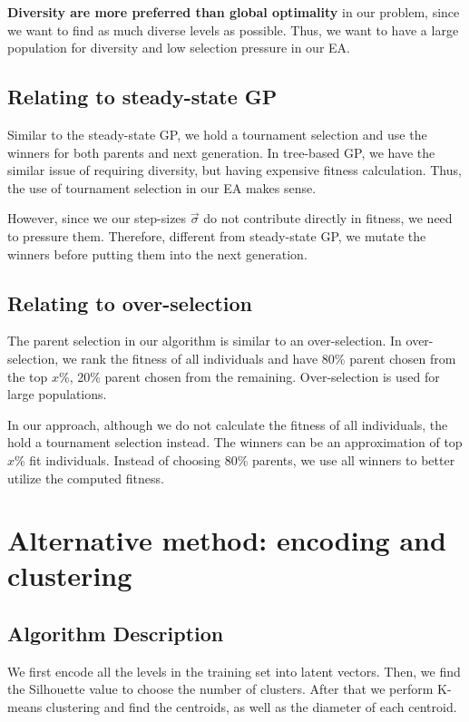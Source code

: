 \documentclass[manuscript,screen,review]{acmart}
\begin{document}
\textbf{Diversity are more preferred than global optimality} in our problem, since we want to find as much diverse levels as possible. Thus, we want to have a large population for diversity and low selection pressure in our EA.

\subsection{Relating to steady-state GP}

Similar to the steady-state GP, we hold a tournament selection and use the winners for both parents and next generation. In tree-based GP, we have the similar issue of requiring diversity, but having expensive fitness calculation. Thus, the use of tournament selection in our EA makes sense.

However, since we our step-sizes $\vec{\sigma}$ do not contribute directly in fitness, we need to pressure them. Therefore, different from steady-state GP, we mutate the winners before putting them into the next generation.

\subsection{Relating to over-selection}

The parent selection in our algorithm is similar to an over-selection. In over-selection, we rank the fitness of all individuals and have 80\% parent chosen from the top $x$\%, 20\% parent chosen from the remaining. Over-selection is used for large populations.

In our approach, although we do not calculate the fitness of all individuals, the hold a tournament selection instead. The winners can be an approximation of top $x$\% fit individuals. Instead of choosing 80\% parents, we use all winners to better utilize the computed fitness.

\section{Alternative method: encoding and clustering}

\subsection{Algorithm Description}
We first encode all the levels in the training set into latent vectors. Then, we find the Silhouette value to choose the number of clusters. After that we perform K-means clustering and find the centroids, as well as the diameter of each centroid.
\end{document}
